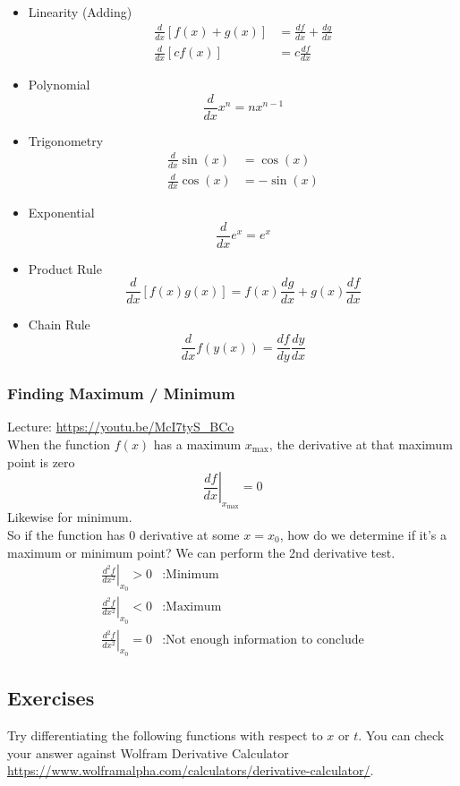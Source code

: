 \documentclass{article}
\begin{document}
\begin{itemize}
    \item Linearity (Adding) 
    \begin{align}
        \frac{d}{dx} [f(x) + g(x)] &= \frac{df}{dx} + \frac{dg}{dx} \\
    \frac{d}{dx} [c f(x)] &= c \frac{df}{dx}
    \end{align}
    \item Polynomial $$ \frac{d}{dx} x^n = nx^{n-1} $$
    \item Trigonometry \begin{align}
        \frac{d}{dx} \sin(x) & = \cos(x) \\
        \frac{d}{dx} \cos(x) & = -\sin(x)
    \end{align}
    \item Exponential $$\frac{d}{dx} e^x = e^x$$
    \item Product Rule $$\frac{d}{dx} [f(x) g(x)] = f(x) \frac{dg}{dx} + g(x) \frac{df}{dx}$$
    \item Chain Rule $$\frac{d}{dx} f(y(x)) = \frac{df}{dy} \frac{dy}{dx}$$
\end{itemize}


\subsubsection{Finding Maximum / Minimum}
Lecture: \url{https://youtu.be/McI7tyS_BCo} \\[10pt]
When the function $f(x)$ has a maximum $x_{\text{max}}$, the derivative at that maximum point is zero $$\left. \frac{df}{dx} \right|_{x_{\text{max}}} = 0$$
Likewise for minimum.\\[10pt]
So if the function has $0$ derivative at some $x=x_0$, how do we determine if it's a maximum or minimum point? We can perform the 2nd derivative test.\\

\begin{align}
    \left. \frac{d^2 f}{dx^2} \right|_{x_0} > 0 &: \text{Minimum}\\
    \left. \frac{d^2 f}{dx^2} \right|_{x_0} < 0 &: \text{Maximum}\\
    \left. \frac{d^2 f}{dx^2} \right|_{x_0} = 0 &: \text{Not enough information to conclude}
\end{align}

\subsection{Exercises}
Try differentiating the following functions with respect to $x$ or $t$. You can check your answer against Wolfram Derivative Calculator \url{https://www.wolframalpha.com/calculators/derivative-calculator/}.
\end{document}
